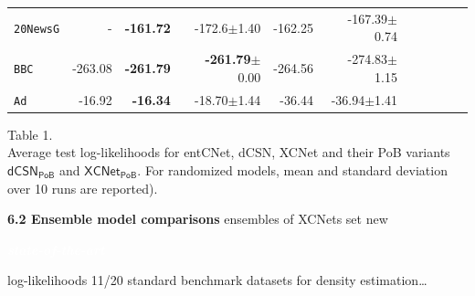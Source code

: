 \documentclass[final]{beamer}
\newcommand{\highlighttext}[2][yellow]{{\colorbox{#1}{\strut\textcolor{white}{#2}}}}
\begin{document}
\begin{frame}{}
\begin{textblock}{17.5}
\begin{minipage}{0.7\linewidth}
\begin{table}[t]
\begin{tabular}{l rrrrrrrrrr}
    \texttt{20NewsG} & - &\textbf{-161.72}&-172.6$\pm$1.40&-162.25&-167.39$\pm$0.74\\
    \texttt{BBC}          &-263.08&\textbf{-261.79}&\textbf{-261.79}$\pm$0.00&-264.56&-274.83$\pm$1.15\\
    \texttt{Ad}           &-16.92&\textbf{-16.34}&-18.70$\pm$1.44&-36.44&-36.94$\pm$1.41\\
    \bottomrule
  \end{tabular}
  \label{tab:ll-sing}
\end{table}
\end{minipage}
\begin{minipage}{0.28\linewidth}
  \scriptsize
  \flushleft
  \vspace{-110pt}
  Table 1.\\
  Average test log-likelihoods for 
  \textsf{entCNet}, \textsf{dCSN}, \textsf{XCNet} and their
  \textsf{PoB} variants $\mathsf{dCSN_{PoB}}$ and $\mathsf{XCNet_{PoB}}$.
    For randomized models, mean and standard deviation over 10 runs are reported).
\end{minipage}

\vspace{10pt}
{\bf 6.2 Ensemble model comparisons}
\small ensembles of XCNets set new \highlighttext[lacamlilac]{\emph{\textbf{state-of-the-art}}} log-likelihoods
 11/20 standard benchmark datasets for density estimation\dots
\vspace{-10pt}
\begin{table}[t]


\end{table}
\end{textblock}
\end{frame}
\end{document}
